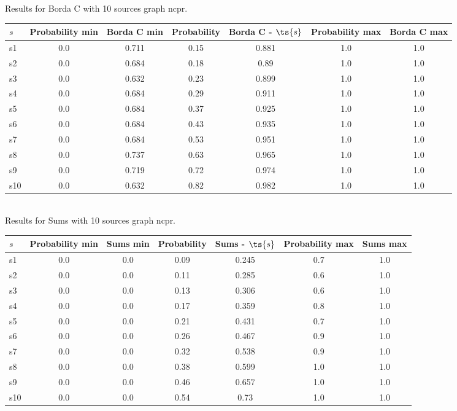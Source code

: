 \documentclass{article}
\begin{document}
\noindent Results for Borda C with 10 sources graph ncpr.

\noindent\begin{tabular}{|l|c|c|c|c|c|c|}
\hline
$s$& Probability min & Borda C min & Probability & Borda C - $\ts{s}$ & Probability max & Borda C max\\
\hline
s1 &0.0 & 0.711 & 0.15 & 0.881 & 1.0 & 1.0\\
\hline
s2 &0.0 & 0.684 & 0.18 & 0.89 & 1.0 & 1.0\\
\hline
s3 &0.0 & 0.632 & 0.23 & 0.899 & 1.0 & 1.0\\
\hline
s4 &0.0 & 0.684 & 0.29 & 0.911 & 1.0 & 1.0\\
\hline
s5 &0.0 & 0.684 & 0.37 & 0.925 & 1.0 & 1.0\\
\hline
s6 &0.0 & 0.684 & 0.43 & 0.935 & 1.0 & 1.0\\
\hline
s7 &0.0 & 0.684 & 0.53 & 0.951 & 1.0 & 1.0\\
\hline
s8 &0.0 & 0.737 & 0.63 & 0.965 & 1.0 & 1.0\\
\hline
s9 &0.0 & 0.719 & 0.72 & 0.974 & 1.0 & 1.0\\
\hline
s10 &0.0 & 0.632 & 0.82 & 0.982 & 1.0 & 1.0\\
\hline
\end{tabular}\\

\noindent Results for Sums with 10 sources graph ncpr.

\noindent\begin{tabular}{|l|c|c|c|c|c|c|}
\hline
$s$& Probability min & Sums min & Probability & Sums - $\ts{s}$ & Probability max & Sums max\\
\hline
s1 &0.0 & 0.0 & 0.09 & 0.245 & 0.7 & 1.0\\
\hline
s2 &0.0 & 0.0 & 0.11 & 0.285 & 0.6 & 1.0\\
\hline
s3 &0.0 & 0.0 & 0.13 & 0.306 & 0.6 & 1.0\\
\hline
s4 &0.0 & 0.0 & 0.17 & 0.359 & 0.8 & 1.0\\
\hline
s5 &0.0 & 0.0 & 0.21 & 0.431 & 0.7 & 1.0\\
\hline
s6 &0.0 & 0.0 & 0.26 & 0.467 & 0.9 & 1.0\\
\hline
s7 &0.0 & 0.0 & 0.32 & 0.538 & 0.9 & 1.0\\
\hline
s8 &0.0 & 0.0 & 0.38 & 0.599 & 1.0 & 1.0\\
\hline
s9 &0.0 & 0.0 & 0.46 & 0.657 & 1.0 & 1.0\\
\hline
s10 &0.0 & 0.0 & 0.54 & 0.73 & 1.0 & 1.0\\
\hline
\end{tabular}\\
\end{document}
